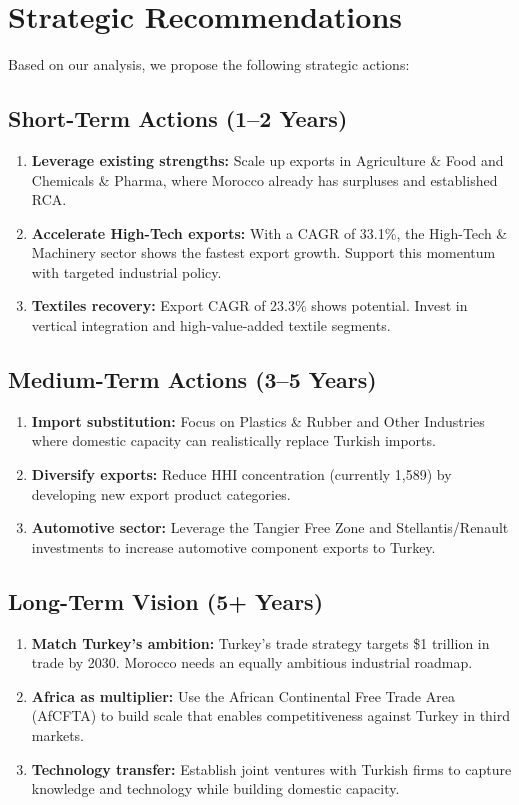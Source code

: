 \documentclass[12pt,a4paper]{article}
\begin{document}
\section{Strategic Recommendations}

Based on our analysis, we propose the following strategic actions:

\subsection{Short-Term Actions (1--2 Years)}

\begin{enumerate}[label=\arabic*.]
\item \textbf{Leverage existing strengths:} Scale up exports in Agriculture \& Food and Chemicals \& Pharma, where Morocco already has surpluses and established RCA.
\item \textbf{Accelerate High-Tech exports:} With a CAGR of 33.1\%, the High-Tech \& Machinery sector shows the fastest export growth. Support this momentum with targeted industrial policy.
\item \textbf{Textiles recovery:} Export CAGR of 23.3\% shows potential. Invest in vertical integration and high-value-added textile segments.
\end{enumerate}

\subsection{Medium-Term Actions (3--5 Years)}

\begin{enumerate}[label=\arabic*.]
\item \textbf{Import substitution:} Focus on Plastics \& Rubber and Other Industries where domestic capacity can realistically replace Turkish imports.
\item \textbf{Diversify exports:} Reduce HHI concentration (currently 1,589) by developing new export product categories.
\item \textbf{Automotive sector:} Leverage the Tangier Free Zone and Stellantis/Renault investments to increase automotive component exports to Turkey.
\end{enumerate}

\subsection{Long-Term Vision (5+ Years)}

\begin{enumerate}[label=\arabic*.]
\item \textbf{Match Turkey's ambition:} Turkey's trade strategy targets \$1 trillion in trade by 2030. Morocco needs an equally ambitious industrial roadmap.
\item \textbf{Africa as multiplier:} Use the African Continental Free Trade Area (AfCFTA) to build scale that enables competitiveness against Turkey in third markets.
\item \textbf{Technology transfer:} Establish joint ventures with Turkish firms to capture knowledge and technology while building domestic capacity.
\end{enumerate}
\end{document}
